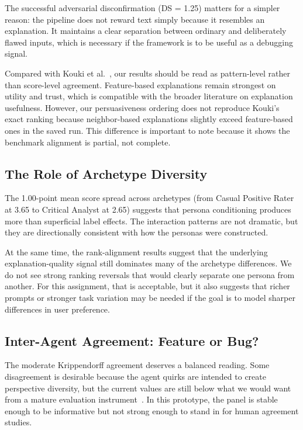 \documentclass[sigconf,nonacm]{acmart}
\begin{document}
The successful adversarial disconfirmation (DS = 1.25) matters for a simpler reason: the pipeline does not reward text simply because it resembles an explanation. It maintains a clear separation between ordinary and deliberately flawed inputs, which is necessary if the framework is to be useful as a debugging signal.

Compared with Kouki et al.~\cite{kouki2019}, our results should be read as pattern-level rather than score-level agreement. Feature-based explanations remain strongest on utility and trust, which is compatible with the broader literature on explanation usefulness. However, our persuasiveness ordering does not reproduce Kouki's exact ranking because neighbor-based explanations slightly exceed feature-based ones in the saved run. This difference is important to note because it shows the benchmark alignment is partial, not complete.

\subsection{The Role of Archetype Diversity}

The 1.00-point mean score spread across archetypes (from Casual Positive Rater at 3.65 to Critical Analyst at 2.65) suggests that persona conditioning produces more than superficial label effects. The interaction patterns are not dramatic, but they are directionally consistent with how the personas were constructed.

At the same time, the rank-alignment results suggest that the underlying explanation-quality signal still dominates many of the archetype differences. We do not see strong ranking reversals that would clearly separate one persona from another. For this assignment, that is acceptable, but it also suggests that richer prompts or stronger task variation may be needed if the goal is to model sharper differences in user preference.

\subsection{Inter-Agent Agreement: Feature or Bug?}

The moderate Krippendorff agreement deserves a balanced reading. Some disagreement is desirable because the agent quirks are intended to create perspective diversity, but the current values are still below what we would want from a mature evaluation instrument~\cite{krippendorff2011}. In this prototype, the panel is stable enough to be informative but not strong enough to stand in for human agreement studies.
\end{document}
